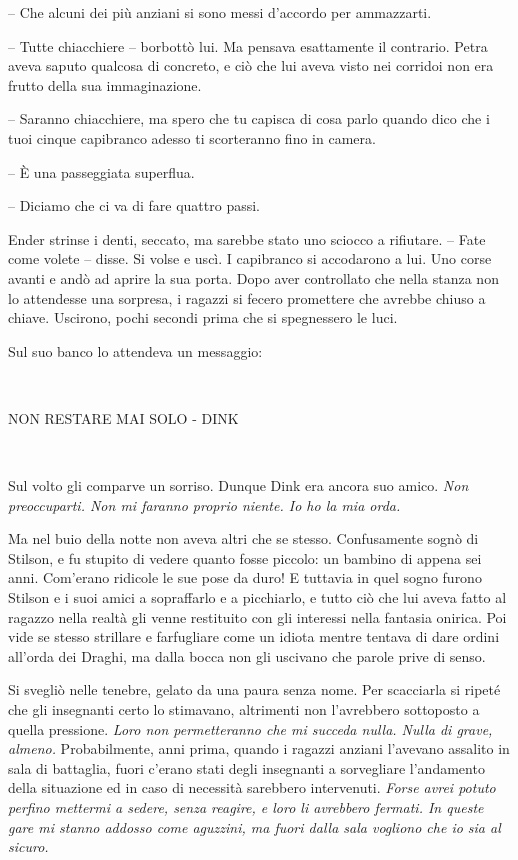 {-- Che alcuni dei più anziani si sono messi d'accordo per ammazzarti.}

{-- Tutte chiacchiere -- borbottò lui. Ma pensava esattamente il
	contrario. Petra aveva saputo qualcosa di concreto, e ciò che lui aveva
	visto nei corridoi non era frutto della sua immaginazione.}

{-- Saranno chiacchiere, ma spero che tu capisca di cosa parlo quando
	dico che i tuoi cinque capibranco adesso ti scorteranno fino in camera.}

{-- È una passeggiata superflua.}

{-- Diciamo che ci va di fare quattro passi.}

{Ender strinse i denti, seccato, ma sarebbe stato uno sciocco a
	rifiutare. -- Fate come volete -- disse. Si volse e uscì. I capibranco
	si accodarono a lui. Uno corse avanti e andò ad aprire la sua porta.
	Dopo aver controllato che nella stanza non lo attendesse una sorpresa, i
	ragazzi si fecero promettere che avrebbe chiuso a chiave. Uscirono,
	pochi secondi prima che si spegnessero le luci.}

{Sul suo banco lo attendeva un messaggio:}

{~}

\begin{center}
	{NON RESTARE MAI SOLO - DINK}
\end{center}

{~}

{Sul volto gli comparve un sorriso. Dunque Dink era ancora suo amico.
	\emph{Non preoccuparti. Non mi faranno proprio niente. Io ho la mia
		orda.}}

{Ma nel buio della notte non aveva altri che se stesso. Confusamente
	sognò di Stilson, e fu stupito di vedere quanto fosse piccolo: un
	bambino di appena sei anni. Com'erano ridicole le sue pose da duro! E
	tuttavia in quel sogno furono Stilson e i suoi amici a sopraffarlo e a
	picchiarlo, e tutto ciò che lui aveva fatto al ragazzo nella realtà gli
	venne restituito con gli interessi nella fantasia onirica. Poi vide se
	stesso strillare e farfugliare come un idiota mentre tentava di dare
	ordini all'orda dei Draghi, ma dalla bocca non gli uscivano che parole
	prive di senso.}

{Si svegliò nelle tenebre, gelato da una paura senza nome. Per
	scacciarla si ripeté che gli insegnanti certo lo stimavano, altrimenti
	non l'avrebbero sottoposto a quella pressione. \emph{Loro non
		permetteranno che mi succeda nulla. Nulla di grave, almeno.}
	Probabilmente, anni prima, quando i ragazzi anziani l'avevano assalito
	in sala di battaglia, fuori c'erano stati degli insegnanti a sorvegliare
	l'andamento della situazione ed in caso di necessità sarebbero
	intervenuti. \emph{Forse avrei potuto perfino mettermi a sedere, senza
		reagire, e loro li avrebbero fermati. In queste gare mi stanno addosso
		come aguzzini, ma fuori dalla sala vogliono che io sia al sicuro.}}

